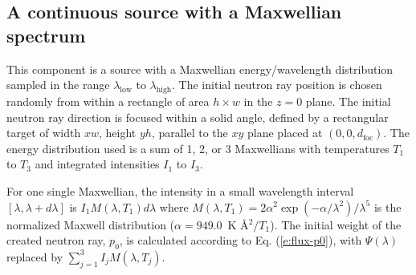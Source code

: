 \subsection*{A continuous source
with a Maxwellian spectrum}
\label{source-maxwell}


This component is a source with a Maxwellian energy/wavelength distribution
sampled in the range $\lambda_\textrm{low}$ to $\lambda_\textrm{high}$.
The initial neutron ray position is chosen randomly from within a
rectangle of area $h \times w$ in the $z=0$ plane.
The initial neutron ray direction is focused within
a solid angle, defined by a rectangular target of width
$xw$, height $yh$, parallel to
the $xy$ plane placed at $(0,0,d_\textrm{foc})$.
The energy distribution used is a sum of 1, 2, or 3 Maxwellians with
temperatures $T_1$ to $T_3$ and integrated intensities $I_1$ to $I_3$.

For one single Maxwellian,
the intensity in a small wavelength interval $[\lambda, \lambda+d\lambda]$ is
$ I_1 M(\lambda,T_1) d\lambda $
where
$M(\lambda,T_1) = 2 \alpha^2 \exp(-\alpha/\lambda^2) / \lambda^5 $
is the normalized Maxwell distribution ($\alpha=949.0$~K \AA$^2/T_1$).
The initial weight of the created neutron ray, $p_0$, is
calculated according to Eq. (\ref{e:flux-p0}), with $\Psi(\lambda)$ replaced
by $\sum_{j=1}^3 I_j M(\lambda,T_j)$.

%
%

